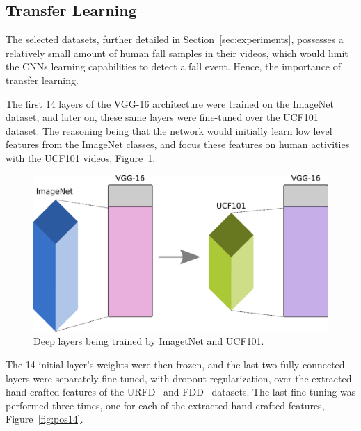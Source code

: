 \documentclass[conference]{IEEEtran}
\begin{document}

\subsection{Transfer Learning}

The selected datasets, further detailed in Section~\ref{sec:experiments}, possesses a relatively small amount of human fall samples in their videos, which would limit the CNNs learning capabilities to detect a fall event. Hence, the importance of transfer learning.

The first 14 layers of the VGG-16 architecture were trained on the ImageNet~\cite{imagenet_cvpr09} dataset, and later on, these same layers were fine-tuned over the UCF101~\cite{soomro2012ucf101} dataset. The reasoning being that the network would initially learn low level features from the ImageNet classes, and focus these features on human activities with the UCF101 videos, Figure~\ref{fig:pre14}.

\begin{figure}[htbp]
\centerline{\includegraphics[width=0.9\linewidth]{figures/pre14.png}}
\caption{Deep layers being trained by ImagetNet and UCF101.}
\label{fig:pre14}
\end{figure}

The 14 initial layer's weights were then frozen, and the last two fully connected layers were separately fine-tuned, with dropout regularization, over the extracted hand-crafted features of the URFD~\cite{kepski2014human} and FDD~\cite{charfi2013optimised} datasets. The last fine-tuning was performed three times, one for each of the extracted hand-crafted features, Figure~\ref{fig:pos14}.
\end{document}
